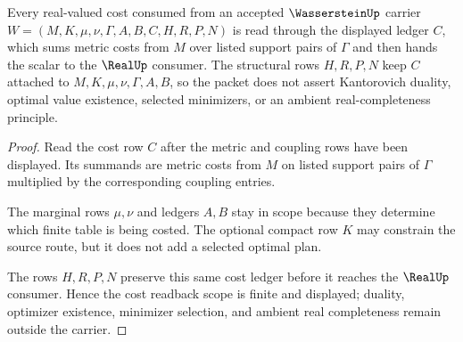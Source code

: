 \begin{theorem}
\label{thm:wasserstein-real-cost-readback-scope}
Every real-valued cost consumed from an accepted $\WassersteinUp$ carrier $W=(M,K,\mu,\nu,\Gamma,A,B,C,H,R,P,N)$ is read through the displayed ledger $C$, which sums metric costs from $M$ over listed support pairs of $\Gamma$ and then hands the scalar to the $\RealUp$ consumer. The structural rows $H,R,P,N$ keep $C$ attached to $M,K,\mu,\nu,\Gamma,A,B$, so the packet does not assert Kantorovich duality, optimal value existence, selected minimizers, or an ambient real-completeness principle.
\end{theorem}
\begin{proof}
Read the cost row $C$ after the metric and coupling rows have been displayed. Its summands are metric costs from $M$ on listed support pairs of $\Gamma$ multiplied by the corresponding coupling entries.

The marginal rows $\mu,\nu$ and ledgers $A,B$ stay in scope because they determine which finite table is being costed. The optional compact row $K$ may constrain the source route, but it does not add a selected optimal plan.

The rows $H,R,P,N$ preserve this same cost ledger before it reaches the $\RealUp$ consumer. Hence the cost readback scope is finite and displayed; duality, optimizer existence, minimizer selection, and ambient real completeness remain outside the carrier.
\end{proof}

